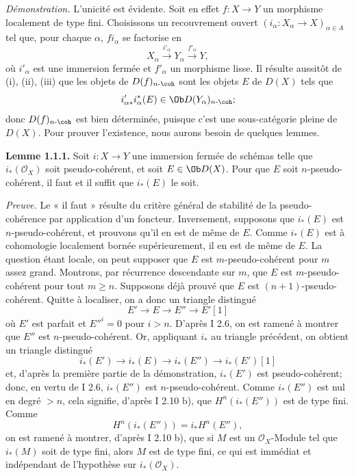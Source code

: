 \documentclass[11pt]{article}
\begin{document}
\emph{Démonstration.} L'unicité est évidente. Soit en effet \(f:X\to Y\) un morphisme localement de type fini. Choisissons un recouvrement ouvert \((i_\alpha:X_\alpha\to X)_{\alpha\in A}\) tel que, pour chaque \(\alpha\), \(fi_\alpha\) se factorise en
\[
  X_\alpha\xrightarrow{i'_\alpha}Y_\alpha\xrightarrow{f'_\alpha}Y,
\]
où \(i'_\alpha\) est une immersion fermée et \(f'_\alpha\) un morphisme lisse. Il résulte aussitôt de (i), (ii), (iii) que les objets de \(D(f)_{n\text{-}\coh}\) sont les objets \(E\) de \(D(X)\) tels que
\[
  i'_{\alpha *}i_\alpha^*(E)\in \Ob D(Y_\alpha)_{n\text{-}\coh};
\]
donc \(D(f)_{n\text{-}\coh}\) est bien déterminée, puisque c'est une sous-catégorie pleine de \(D(X)\). Pour prouver l'existence, nous aurons besoin de quelques lemmes.

\textbf{Lemme 1.1.1.} Soit \(i:X\to Y\) une immersion fermée de schémas telle que \(i_*(\mathcal O_X)\) soit pseudo-cohérent, et soit \(E\in\Ob D(X)\). Pour que \(E\) soit \(n\)-pseudo-cohérent, il faut et il suffit que \(i_*(E)\) le soit.

\emph{Preuve.} Le « il faut » résulte du critère général de stabilité de la pseudo-cohérence par application d'un foncteur. Inversement, supposons que \(i_*(E)\) est \(n\)-pseudo-cohérent, et prouvons qu'il en est de même de \(E\). Comme \(i_*(E)\) est à cohomologie localement bornée supérieurement, il en est de même de \(E\). La question étant locale, on peut supposer que \(E\) est \(m\)-pseudo-cohérent pour \(m\) assez grand. Montrons, par récurrence descendante sur \(m\), que \(E\) est \(m\)-pseudo-cohérent pour tout \(m\geq n\). Supposons déjà prouvé que \(E\) est \((n+1)\)-pseudo-cohérent. Quitte à localiser, on a donc un triangle distingué
\[
E'\longrightarrow E\longrightarrow E''\longrightarrow E'[1]
\]
où \(E'\) est parfait et \(E''^i=0\) pour \(i>n\). D'après I 2.6, on est ramené à montrer que \(E''\) est \(n\)-pseudo-cohérent. Or, appliquant \(i_*\) au triangle précédent, on obtient un triangle distingué
\[
i_*(E')\longrightarrow i_*(E)\longrightarrow i_*(E'')\longrightarrow i_*(E')[1]
\]
et, d'après la première partie de la démonstration, \(i_*(E')\) est pseudo-cohérent; donc, en vertu de I 2.6, \(i_*(E'')\) est \(n\)-pseudo-cohérent. Comme \(i_*(E'')\) est nul en degré \(>n\), cela signifie, d'après I 2.10 b), que \(H^n(i_*(E''))\) est de type fini. Comme
\[
  H^n(i_*(E''))=i_*H^n(E''),
\]
on est ramené à montrer, d'après I 2.10 b), que si \(M\) est un \(\mathcal O_X\)-Module tel que \(i_*(M)\) soit de type fini, alors \(M\) est de type fini, ce qui est immédiat et indépendant de l'hypothèse sur \(i_*(\mathcal O_X)\).
\end{document}
